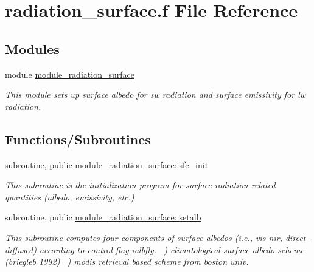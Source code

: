\hypertarget{radiation__surface_8f}{}\section{radiation\+\_\+surface.\+f File Reference}
\label{radiation__surface_8f}
\subsection*{Modules}
\begin{DoxyCompactItemize}
\item 
module \hyperlink{namespacemodule__radiation__surface}{module\+\_\+radiation\+\_\+surface}
\begin{DoxyCompactList}\small\item\em This module sets up surface albedo for sw radiation and surface emissivity for lw radiation. \end{DoxyCompactList}\end{DoxyCompactItemize}
\subsection*{Functions/\+Subroutines}
\begin{DoxyCompactItemize}
\item 
subroutine, public \hyperlink{namespacemodule__radiation__surface_acb6f94d91110828e4c117e3ba0b279a5}{module\+\_\+radiation\+\_\+surface\+::sfc\+\_\+init}                                                                                           
\begin{DoxyCompactList}\small\item\em This subroutine is the initialization program for surface radiation related quantities (albedo, emissivity, etc.) \end{DoxyCompactList}\end{DoxyCompactItemize}
{\bf }\par
\begin{DoxyCompactItemize}
\item 
subroutine, public \hyperlink{namespacemodule__radiation__surface_a79d2feaf2f32435b179ef7bc86ad3f36}{module\+\_\+radiation\+\_\+surface\+::setalb}                                                                                               
\begin{DoxyCompactList}\small\item\em This subroutine computes four components of surface albedos (i.\+e., vis-\/nir, direct-\/diffused) according to control flag ialbflg. ~) climatological surface albedo scheme (briegleb 1992) ~) modis retrieval based scheme from boston univ. \end{DoxyCompactList}\end{DoxyCompactItemize}

